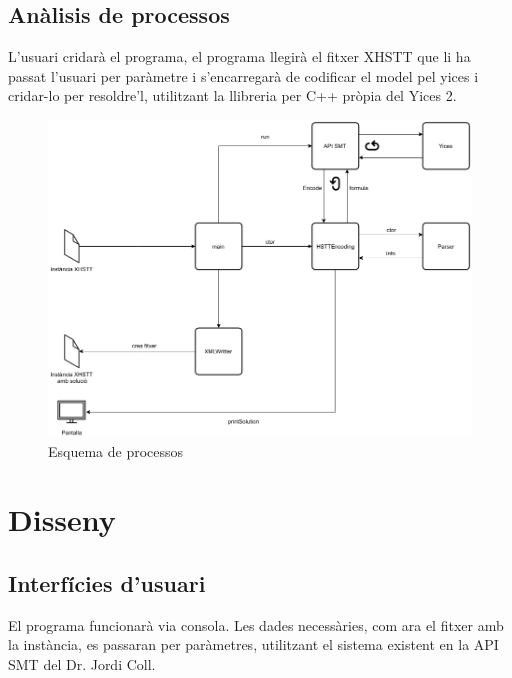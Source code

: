 \documentclass[11pt,a4paper,twoside]{report}
\begin{document}
  \subsection{Anàlisis de processos}
  L'usuari cridarà el programa, el programa llegirà el fitxer XHSTT que li ha passat l'usuari per paràmetre i s'encarregarà de codificar el model pel yices i cridar-lo per resoldre'l, utilitzant la llibreria per C++ pròpia del Yices 2.
  \begin{figure}[p]
    \includegraphics[width=\textwidth]{Diagrames/Arqui2.png}
    \caption{Esquema de processos}
    \label{fig:procs}
  \end{figure}
  

  
  \section{Disseny}    
  \subsection{Interfícies d'usuari}
  El programa funcionarà via consola. Les dades necessàries, com ara el fitxer amb la instància, es passaran per paràmetres, utilitzant el sistema existent en la API SMT del Dr. Jordi Coll.
\end{document}
